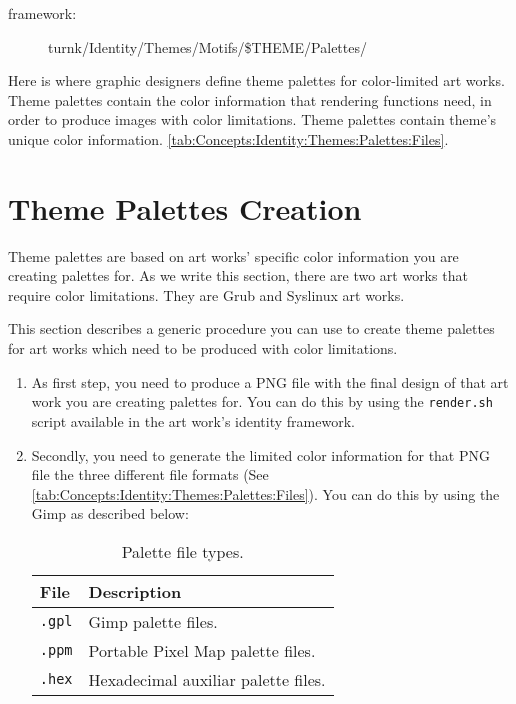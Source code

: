 \begin{description}
\item[framework:] turnk/Identity/Themes/Motifs/\$THEME/Palettes/\\
\end{description}

\noindent Here is where graphic designers define theme palettes for
color-limited art works. Theme palettes contain the color information
that rendering functions need, in order to produce images with color
limitations.  Theme palettes contain theme's unique color information.
\autoref{tab:Concepts:Identity:Themes:Palettes:Files}.

\section{Theme Palettes Creation}
\hypertarget{sec:Concepts:Identity:Themes:Palettes:Creation}{}
\label{sec:Concepts:Identity:Themes:Palettes:Creation}

Theme palettes are based on art works' specific color information you
are creating palettes for. As we write this section, there are two art
works that require color limitations. They are Grub and Syslinux art
works.

This section describes a generic procedure you can use to create theme
palettes for art works which need to be produced with color
limitations.

\begin{enumerate}

\item As first step, you need to produce a PNG file with the final
design of that art work you are creating palettes for.  You can do
this by using the \texttt{render.sh} script available in the art
work's identity framework.

\item Secondly, you need to generate the limited color information for
that PNG file the three different file formats (See
\autoref{tab:Concepts:Identity:Themes:Palettes:Files}). You can do
this by using the Gimp as described below: 

\begin{table}[!hbp]
\center
\begin{tabular}{ll}
\hline
\textbf{File} & \textbf{Description}\\
\hline
\texttt{.gpl} & Gimp palette files.\\
\texttt{.ppm} & Portable Pixel Map palette files.\\
\texttt{.hex} & Hexadecimal auxiliar palette files.\\
\hline
\end{tabular}
\caption{Palette file types.%
   \label{tab:Concepts:Identity:Themes:Palettes:Files}}
\end{table}

\end{enumerate}

